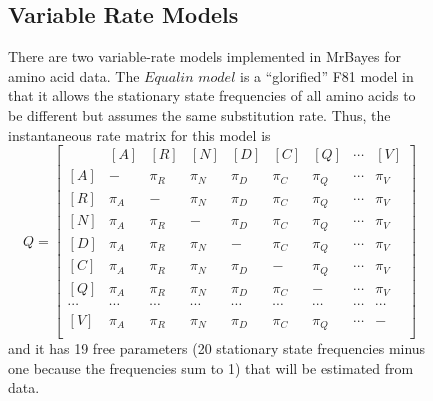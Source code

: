 \documentclass[12pt]{book}
\begin{document}
\begin{figure}[h]
\subsection{Variable Rate Models}

There are two variable-rate models implemented in MrBayes for amino acid data. The $Equalin$
$model$ is a ``glorified'' F81 model in that it allows the stationary state frequencies of all
amino acids to be different but assumes the same substitution rate. Thus, the instantaneous rate
matrix for this model is
\footnotesize
\[
Q=\begin{bmatrix}
    & [A] & [R] & [N] & [D] & [C] & [Q] & \cdots & [V]\\
 [A]& - & \pi_{R} & \pi_{N} & \pi_{D}& \pi_{C}& \pi_{Q} & \cdots & \pi_V\\
 [R]& \pi_{A} &- &  \pi_{N} & \pi_{D}& \pi_{C}& \pi_{Q} & \cdots & \pi_V\\
 [N]& \pi_{A} &\pi_{R} &- &   \pi_{D}& \pi_{C}& \pi_{Q} & \cdots & \pi_V\\
 [D]& \pi_{A} &\pi_{R} &  \pi_{N}&- &  \pi_{C}& \pi_{Q} & \cdots & \pi_V\\
 [C]& \pi_{A} &\pi_{R} &  \pi_{N}&  \pi_{D}&- & \pi_{Q} & \cdots & \pi_V\\
 [Q]& \pi_{A} &\pi_{R} &  \pi_{N}&  \pi_{D}& \pi_{C} &- & \cdots & \pi_V\\
 \cdots& \cdots& \cdots& \cdots& \cdots& \cdots& \cdots& \cdots& \cdots\\
 [V]& \pi_{A} &\pi_{R} &  \pi_{N}&  \pi_{D}& \pi_{C} &\pi_Q & \cdots &- \\
\end{bmatrix}
\]
\normalsize
and it has 19 free parameters (20 stationary state frequencies minus one because the frequencies
sum to 1) that will be estimated from data.


\end{figure}
\end{document}
